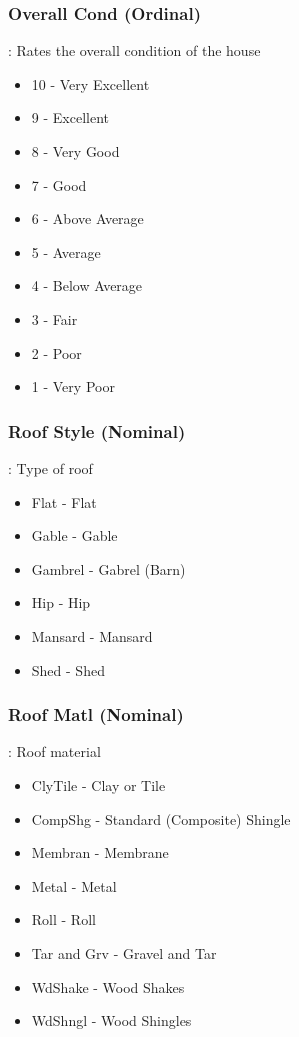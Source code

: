 \documentclass[sigconf]{acmart}
\begin{document}
	\subsubsection{Overall Cond (Ordinal)}: Rates the overall condition of the house
	\begin{itemize}
		\item  10 - Very Excellent
		\item  9 -  Excellent
		\item  8 -  Very Good
		\item  7 -  Good
		\item  6 -  Above Average
		\item  5 -  Average
		\item  4 -  Below Average
		\item  3 -  Fair
		\item  2 -  Poor
		\item  1 -  Very Poor
	\end{itemize}
	
	\subsubsection{Roof Style (Nominal)}: Type of roof
	\begin{itemize}
		
		\item  Flat - Flat
		\item  Gable - Gable
		\item  Gambrel - Gabrel (Barn)
		\item  Hip - Hip
		\item  Mansard - Mansard
		\item  Shed - Shed
	\end{itemize}
	
	\subsubsection{Roof Matl (Nominal)}: Roof material
	\begin{itemize}
		\item  ClyTile - Clay or Tile
		\item  CompShg - Standard (Composite) Shingle
		\item  Membran - Membrane
		\item  Metal -   Metal
		\item  Roll - Roll
		\item  Tar and Grv - Gravel and Tar
		\item  WdShake - Wood Shakes
		\item  WdShngl - Wood Shingles
	\end{itemize}
	
\end{document}
